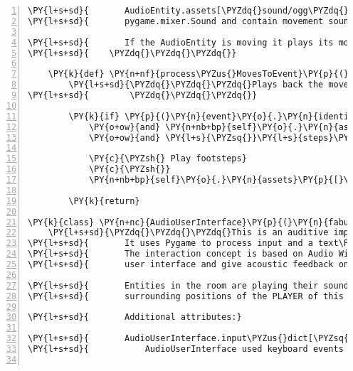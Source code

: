 \begin{Verbatim}[commandchars=\\\{\},numbers=left,firstnumber=1,stepnumber=1]
\PY{l+s+sd}{       AudioEntity.assets[\PYZdq{}sound/ogg\PYZdq{}].data is supposed to be an instance of}
\PY{l+s+sd}{       pygame.mixer.Sound and contain movement sound e.g. step sounds.}

\PY{l+s+sd}{       If the AudioEntity is moving it plays its moving sound.}
\PY{l+s+sd}{    \PYZdq{}\PYZdq{}\PYZdq{}}

    \PY{k}{def} \PY{n+nf}{process\PYZus{}MovesToEvent}\PY{p}{(}\PY{n+nb+bp}{self}\PY{p}{,} \PY{n}{event}\PY{p}{)}\PY{p}{:}
        \PY{l+s+sd}{\PYZdq{}\PYZdq{}\PYZdq{}Plays back the movement sounds of the AudioEntity.}
\PY{l+s+sd}{        \PYZdq{}\PYZdq{}\PYZdq{}}

        \PY{k}{if} \PY{p}{(}\PY{n}{event}\PY{o}{.}\PY{n}{identifier} \PY{o+ow}{is} \PY{n+nb+bp}{self}\PY{o}{.}\PY{n}{identifier}
            \PY{o+ow}{and} \PY{n+nb+bp}{self}\PY{o}{.}\PY{n}{assets}\PY{p}{[}\PY{l+s}{\PYZsq{}}\PY{l+s}{audio/ogg}\PY{l+s}{\PYZsq{}}\PY{p}{]}\PY{o}{.}\PY{n}{data} \PY{o+ow}{is} \PY{o+ow}{not} \PY{n+nb+bp}{None}
            \PY{o+ow}{and} \PY{l+s}{\PYZsq{}}\PY{l+s}{steps}\PY{l+s}{\PYZsq{}} \PY{o+ow}{in} \PY{n+nb+bp}{self}\PY{o}{.}\PY{n}{assets}\PY{p}{[}\PY{l+s}{\PYZsq{}}\PY{l+s}{audio/ogg}\PY{l+s}{\PYZsq{}}\PY{p}{]}\PY{o}{.}\PY{n}{uri}\PY{p}{)}\PY{p}{:}

            \PY{c}{\PYZsh{} Play footsteps}
            \PY{c}{\PYZsh{}}
            \PY{n+nb+bp}{self}\PY{o}{.}\PY{n}{assets}\PY{p}{[}\PY{l+s}{\PYZsq{}}\PY{l+s}{audio/ogg}\PY{l+s}{\PYZsq{}}\PY{p}{]}\PY{o}{.}\PY{n}{data}\PY{o}{.}\PY{n}{play}\PY{p}{(}\PY{p}{)}

        \PY{k}{return}

\PY{k}{class} \PY{n+nc}{AudioUserInterface}\PY{p}{(}\PY{n}{fabula}\PY{o}{.}\PY{n}{plugins}\PY{o}{.}\PY{n}{ui}\PY{o}{.}\PY{n}{UserInterface}\PY{p}{)}\PY{p}{:}
    \PY{l+s+sd}{\PYZdq{}\PYZdq{}\PYZdq{}This is an auditive implementation of an UserInterface for the Fabula Client.}
\PY{l+s+sd}{       It uses Pygame to process input and a text\PYZhy{}to\PYZhy{}speech engine to read.}
\PY{l+s+sd}{       The interaction concept is based on Audio Widgets which represent the}
\PY{l+s+sd}{       user interface and give acoustic feedback on player input.}

\PY{l+s+sd}{       Entities in the room are playing their sounds if they are in the}
\PY{l+s+sd}{       surrounding positions of the PLAYER of this user interface.}

\PY{l+s+sd}{       Additional attributes:}

\PY{l+s+sd}{       AudioUserInterface.input\PYZus{}dict[\PYZsq{}keyboard\PYZsq{}] = True}
\PY{l+s+sd}{           AudioUserInterface used keyboard events to collect player input.}


\end{Verbatim}
